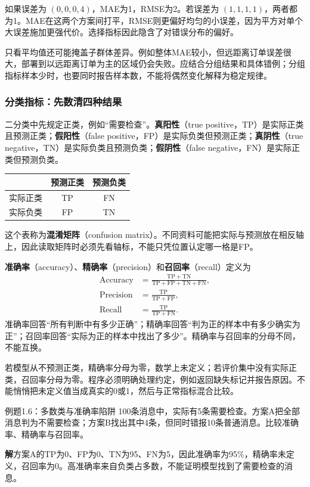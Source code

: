 \documentclass[UTF8,fontset=none,zihao=-4,a4paper]{ctexart}
\newcommand{\term}[1]{\textbf{#1}}
\newcommand{\sol}{\par\noindent\textbf{解}\quad}
\numberwithin{equation}{section}
\numberwithin{figure}{section}
\begin{document}
如果误差为 $(0,0,0,4)$，MAE为1，RMSE为2。若误差为 $(1,1,1,1)$，两者都为1。MAE在这两个方案间打平，RMSE则更偏好均匀的小误差，因为平方对单个大误差施加更强代价。选择指标因此隐含了对错误分布的偏好。

只看平均值还可能掩盖子群体差异。例如整体MAE较小，但远距离订单误差很大，部署到以远距离订单为主的区域仍会失败。应结合分组结果和具体错例；分组指标样本少时，也要同时报告样本数，不能将偶然变化解释为稳定规律。

\subsubsection{分类指标：先数清四种结果}
二分类中先规定正类，例如“需要检查”。\term{真阳性}（true positive，TP）是实际正类且预测正类；\term{假阳性}（false positive，FP）是实际负类但预测正类；\term{真阴性}（true negative，TN）是实际负类且预测负类；\term{假阴性}（false negative，FN）是实际正类但预测负类。
\begin{center}
\begin{tabular}{lcc}
\toprule
 & 预测正类 & 预测负类\\\midrule
实际正类 & TP & FN\\
实际负类 & FP & TN\\\bottomrule
\end{tabular}
\end{center}
这个表称为\term{混淆矩阵}（confusion matrix）。不同资料可能把实际与预测放在相反轴上，因此读取矩阵时必须先看轴标，不能只凭位置认定哪一格是FP。

\term{准确率}（accuracy）、\term{精确率}（precision）和\term{召回率}（recall）定义为
\begin{align}
 \mathrm{Accuracy}&=\frac{\mathrm{TP}+\mathrm{TN}}{\mathrm{TP}+\mathrm{FP}+\mathrm{TN}+\mathrm{FN}},\\
 \mathrm{Precision}&=\frac{\mathrm{TP}}{\mathrm{TP}+\mathrm{FP}},\\
 \mathrm{Recall}&=\frac{\mathrm{TP}}{\mathrm{TP}+\mathrm{FN}}.
\end{align}
准确率回答“所有判断中有多少正确”；精确率回答“判为正的样本中有多少确实为正”；召回率回答“实际为正的样本中找出了多少”。精确率与召回率的分母不同，不能互换。

若模型从不预测正类，精确率分母为零，数学上未定义；若评价集中没有实际正类，召回率分母为零。程序必须明确处理约定，例如返回缺失标记并报告原因。不能悄悄把未定义值当成真实的0或1，然后与正常指标混合比较。

\begin{infobox}{例题1.6：多数类与准确率陷阱}
100条消息中，实际有5条需要检查。方案A把全部消息判为不需要检查；方案B找出其中4条，但同时错报10条普通消息。比较准确率、精确率与召回率。
\end{infobox}
\sol 方案A的TP为0、FP为0、TN为95、FN为5，因此准确率为95\%，精确率未定义，召回率为0。高准确率来自负类占多数，不能证明模型找到了需要检查的消息。
\end{document}
